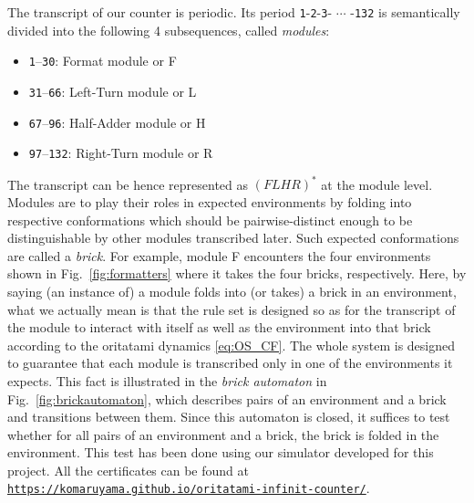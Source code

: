 \documentclass[runningheads]{llncs}
\begin{document}
The transcript of our counter is periodic.
Its period \texttt{1}-\texttt{2}-\texttt{3}- $\cdots$ -\texttt{132} is semantically divided into the following 4 subsequences, called \textit{modules}:
\begin{itemize}
\item \texttt{1}--\texttt{30}: Format module or F
\item \texttt{31}--\texttt{66}: Left-Turn module or L
\item \texttt{67}--\texttt{96}: Half-Adder module or H
\item \texttt{97}--\texttt{132}: Right-Turn module  or R
\end{itemize}
The transcript can be hence represented as $(FLHR)^*$ at the module level. Modules are to play their roles in expected environments by folding into respective conformations which should be pairwise-distinct enough to be distinguishable by other modules transcribed later.
Such expected conformations are called a \textit{brick}.
For example, module F encounters the four environments shown in Fig.~\ref{fig:formatters} where it takes the four bricks, respectively.
Here, by saying (an instance of) a module folds into (or takes) a brick in an environment, what we actually mean is that the rule set is designed so as for the transcript of the module to interact with itself as well as the environment into that brick according to the oritatami dynamics  \eqref{eq:OS_CF}.
The whole system is designed to guarantee that each module is transcribed only in one of the environments it expects.
This fact is illustrated in the \textit{brick automaton} in Fig.~\ref{fig:brickautomaton}, which describes pairs of an environment and a brick and transitions between them.
Since this automaton is closed, it suffices to test whether for all pairs of an environment and a brick, the brick is folded in the environment.
This test has been done using our simulator developed for this project.
All the certificates can be found at \href{https://komaruyama.github.io/oritatami-infinit-counter/}{\texttt{https://komaruyama.github.io/oritatami-infinit-counter/}}.
\end{document}
